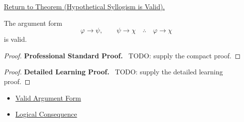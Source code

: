 \newpage
{}
\label{prf:hypothetical-syllogism-validity-propositional-logic}

\begin{remark*}[Return]
\hyperref[thm:hypothetical-syllogism-validity-propositional-logic]{Return to Theorem (Hypothetical Syllogism is Valid).}
\end{remark*}

\begin{theorem*}
The argument form
\[
\varphi\to\psi,\qquad \psi\to\chi \quad\therefore\quad \varphi\to\chi
\]
is valid.
\end{theorem*}

\begin{proof}
\textbf{Professional Standard Proof.}~
TODO: supply the compact proof.
\end{proof}

\begin{proof}
\textbf{Detailed Learning Proof.}~
TODO: supply the detailed learning proof.
\end{proof}

\begin{remark*}
\end{remark*}

\begin{dependencies}
\begin{itemize}
  \item \hyperref[def:valid-argument-form-propositional-logic]{Valid Argument Form}
  \item \hyperref[def:logical-consequence-propositional-logic]{Logical Consequence}
\end{itemize}
\end{dependencies}

\clearpage
